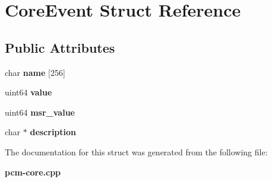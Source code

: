 \section{Core\+Event Struct Reference}
\label{structCoreEvent}
\subsection*{Public Attributes}
\begin{DoxyCompactItemize}
\item 
char {\bfseries name} [256]\label{structCoreEvent_adfc317377ca5e570e76cefb0bcb956a7}

\item 
uint64 {\bfseries value}\label{structCoreEvent_aee18e455c55f0af436f9232e80eba77d}

\item 
uint64 {\bfseries msr\+\_\+value}\label{structCoreEvent_a6bea66846abee2af316f5c38069d0768}

\item 
char $\ast$ {\bfseries description}\label{structCoreEvent_a938a4c4c72139b70a6a647698e4a2121}

\end{DoxyCompactItemize}


The documentation for this struct was generated from the following file\+:\begin{DoxyCompactItemize}
\item 
{\bf pcm-\/core.\+cpp}\end{DoxyCompactItemize}
